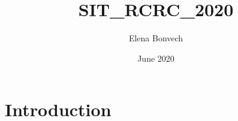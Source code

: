 \documentclass{article}
\title{SIT_RCRC_2020}
\author{Elena Bonvech}
\date{June 2020}
\begin{document}
\maketitle

\section{Introduction}
\end{document}
